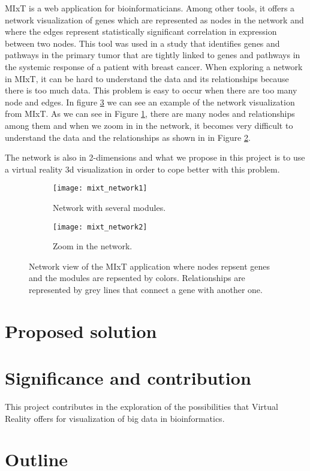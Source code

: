 MIxT\cite{fjukstad_dumeaux_olsen_lund_hallett_bongo_2017} is a web application for bioinformaticians. Among other tools, it offers a network visualization of genes which are represented as nodes in the network and where the edges represent statistically significant correlation in expression between two nodes. This tool was used in a study\cite{dumeaux_fjukstad_interactions_tumor_blood} that identifies genes and pathways in the primary tumor that are tightly linked to genes and pathways in the systemic response of a patient with breast cancer.
When exploring a network in MIxT, it can be hard to understand the data and its relationships because there is too much data. This problem is easy to occur when there are too many node and edges. In figure \ref{fig:mixt_network} we can see an example of the network visualization from MIxT. As we can see in Figure \ref{fig:mixt_network1}, there are many nodes and relationships among them and when we zoom in in the network, it becomes very difficult to understand the data and the relationships as shown in in Figure \ref{fig:mixt_network_zoom}.

 The network is also in 2-dimensions and what we propose in this project is to use a virtual reality 3d visualization in order to cope better with this problem.

\begin{figure}[h!]
    \centering%
    \begin{subfigure}[t]{0.5\textwidth}
        \centering%
        \texttt{[image: mixt\_network1]}
        \caption{Network with several modules.}
        \label{fig:mixt_network1}
    \end{subfigure}%
    \begin{subfigure}[t]{0.5\textwidth}
        \centering%
        \texttt{[image: mixt\_network2]}
        \caption{Zoom in the network.}
        \label{fig:mixt_network_zoom}
    \end{subfigure}

    \caption{Network view of the MIxT application where nodes repsent genes and the modules are repsented by colors. Relationships are represented by grey lines that connect a gene with another one.}
    \label{fig:mixt_network}
\end{figure}

\section{Proposed solution}

\section{Significance and contribution}
This project contributes in the exploration of the possibilities that Virtual Reality offers for visualization of big data in bioinformatics.

\section{Outline}

